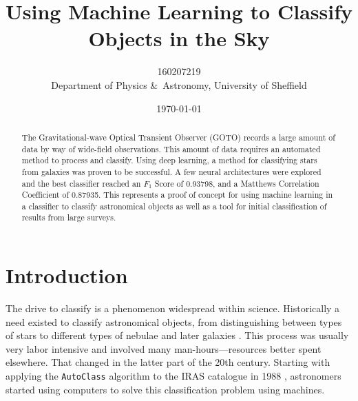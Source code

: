 \documentclass[a4paper,fleqn,usenatbib]{mnras}
\title[Machine Learning Astronomical Classification]{Using Machine Learning to Classify Objects in the Sky}
\author[160207219]{160207219
\\
Department of Physics \&\ Astronomy, University of Sheffield}
\date{\today}
\begin{document}
\label{firstpage}
\pagerange{\pageref{firstpage}--\pageref{lastpage}}
\maketitle

\begin{abstract}
The Gravitational-wave Optical Transient Observer (GOTO) records a large amount of data by way of wide-field observations. This amount of data requires an automated method to process and classify. Using deep learning, a method for classifying stars from galaxies was proven to be successful. A few neural architectures were explored and the best classifier reached an $F_1$ Score of 0.93798, and a Matthews Correlation Coefficient of 0.87935. This represents a proof of concept for using machine learning in a classifier to classify astronomical objects as well as a tool for initial classification of results from large surveys.
\end{abstract}







\section{Introduction}
\label{sec:introduction}

The drive to classify is a phenomenon widespread within science. Historically a need existed to classify astronomical objects, from distinguishing between types of stars \citep{HarvardClassification} to different types of nebulae \citep{Nebulae} and later galaxies \citep{Hubble}. This process was usually very labor intensive and involved many man-hours---resources better spent elsewhere. That changed in the latter part of the 20th century. Starting with applying the \texttt{AutoClass} algorithm to the IRAS catalogue in 1988 \citep{adorf_1988_supervised}, astronomers started using computers to solve this classification problem using machines.
\end{document}
